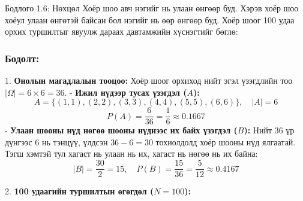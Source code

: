 \documentclass[11pt,a4paper]{article}
\begin{document}
\begin{problembox}{Бодлого 1.6: Нөхцөл}
Хоёр шоо авч нэгийг нь улаан өнгөөр буд. Хэрэв хоёр шоо хоёул улаан өнгөтэй байсан бол нэгийг нь өөр өнгөөр буд. Хоёр шоог 100 удаа орхих туршилтыг явуулж дараах давтамжийн хүснэгтийг бөглө:
\begin{center}
\small
{}
\end{center}
\end{problembox}

\subsubsection*{Бодолт:}

1. 				\textbf{Онолын магадлалын тооцоо:}
   Хоёр шоог орхиход нийт эгэл үзэгдлийн тоо $|\Omega| = 6 \times 6 = 36$.
   - 				\textbf{Ижил нүдээр тусах үзэгдэл ($A$):}
     \[
       A = \{(1,1), (2,2), (3,3), (4,4), (5,5), (6,6)\}, \quad |A| = 6
     \]
     \[
       P(A) = \frac{6}{36} = \frac{1}{6} \approx 0.1667
     \]
   - 				\textbf{Улаан шооны нүд нөгөө шооны нүднээс их байх үзэгдэл ($B$):}
     Нийт 36 үр дүнгээс 6 нь тэнцүү, үлдсэн $36 - 6 = 30$ тохиолдолд хоёр шооны нүд ялгаатай. Тэгш хэмтэй тул хагаст нь улаан нь их, хагаст нь нөгөө нь их байна:
     \[
       |B| = \frac{30}{2} = 15, \quad P(B) = \frac{15}{36} = \frac{5}{12} \approx 0.4167
     \]

2. 				\textbf{100 удаагийн туршилтын өгөгдөл ($N = 100$):}
\begin{center}
\small
{}
\end{center}
\end{document}
